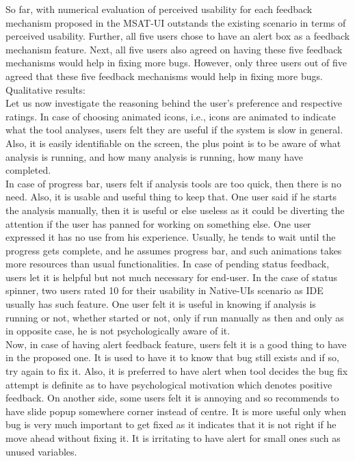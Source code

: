 So far, with numerical evaluation of perceived usability for each feedback mechanism proposed in the MSAT-UI outstands the existing scenario in terms of perceived usability. 
Further, all five users chose to have an alert box as a feedback mechanism feature. Next, all five users also agreed on having these five feedback mechanisms would help in fixing more bugs. However, only three users out of five agreed that these five feedback mechanisms would help in fixing more bugs. \\

Qualitative results: \\

Let us now investigate the reasoning behind the user’s preference and respective ratings. In case of choosing animated icons, i.e., icons are animated to indicate what the tool analyses, users felt they are useful if the system is slow in general. Also, it is easily identifiable on the screen, the plus point is to be aware of what analysis is running, and how many analysis is running, how many have completed. \\

In case of progress bar, users felt if analysis tools are too quick, then there is no need. Also, it is usable and useful thing to keep that. One user said if he starts the analysis manually, then it is useful or else useless as it could be diverting the attention if the user has panned for working on something else. One user expressed it has no use from his experience. Usually, he tends to wait until the progress gets complete, and he assumes progress bar, and such animations takes more resources than usual functionalities. In case of pending status feedback, users let it is helpful but not much necessary for end-user. In the case of status spinner, two users rated 10 for their usability in Native-UIs scenario as IDE usually has such feature. One user felt it is useful in knowing if analysis is running or not, whether started or not, only if run manually as then and only as in opposite case, he is not psychologically aware of it. \\

Now, in case of having alert feedback feature, users felt it is a good thing to have in the proposed one. It is used to have it to know that bug still exists and if so, try again to fix it. Also, it is preferred to have alert when tool decides the bug fix attempt is definite as to have psychological motivation which denotes positive feedback. On another side, some users felt it is annoying and so recommends to have slide popup somewhere corner instead of centre. It is more useful only when bug is very much important to get fixed as it indicates that it is not right if he move ahead without fixing it. It is irritating to have alert for small ones such as unused variables. \\
 
